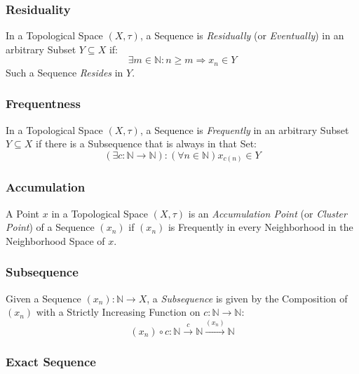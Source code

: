 \subsubsection{Residuality}\label{sec:reside}

In a Topological Space $(X, \tau)$, a Sequence is \emph{Residually}
(or \emph{Eventually}) in an arbitrary Subset $Y \subseteq X$ if:
\[
  \exists m \in \mathbb{N} : n \geq m \Rightarrow x_n \in Y
\]
Such a Sequence \emph{Resides} in $Y$.



\subsubsection{Frequentness}\label{sec:frequent}

In a Topological Space $(X, \tau)$, a Sequence is \emph{Frequently}
in an arbitrary Subset $Y \subseteq X$ if there is a Subsequence that
is always in that Set:
\[
  (\exists c : \mathbb{N} \rightarrow \mathbb{N})
  : (\forall n \in \mathbb{N}) x_{c(n)} \in Y
\]



\subsubsection{Accumulation}\label{sec:accumulation}

A Point $x$ in a Topological Space $(X, \tau)$ is an
\emph{Accumulation Point} (or \emph{Cluster Point}) of a Sequence
$(x_n)$ if $(x_n)$ is Frequently in every Neighborhood in the
Neighborhood Space of $x$.



\subsubsection{Subsequence}\label{sec:subsequence_topology}

Given a Sequence $(x_n) : \mathbb{N} \rightarrow X$, a
\emph{Subsequence} is given by the Composition of $(x_n)$ with a
Strictly Increasing Function on $c : \mathbb{N} \rightarrow
\mathbb{N}$:
\[
  (x_n) \circ c :
  \mathbb{N} \xrightarrow{c} \mathbb{N} \xrightarrow{(x_n)} \mathbb{N}
\]



\subsubsection{Exact Sequence}\label{sec:exact_sequence}

